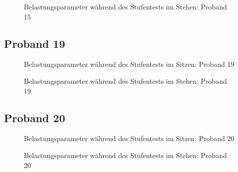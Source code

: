 \documentclass[
  letterpaper,
  DIV=11]{scrartcl}
\begin{document}
\begin{figure}


\caption{\label{fig-ST2_15}Belastungsparameter während des Stufentests
im Stehen: Proband 15}

\end{figure}%

\subsection{Proband 19}

\begin{figure}


\caption{\label{fig-ST1_19}Belastungsparameter während des Stufentests
im Sitzen: Proband 19}

\end{figure}%

\begin{figure}


\caption{\label{fig-ST2_19}Belastungsparameter während des Stufentests
im Stehen: Proband 19}

\end{figure}%

\subsection{Proband 20}

\begin{figure}


\caption{\label{fig-ST1_20}Belastungsparameter während des Stufentests
im Sitzen: Proband 20}

\end{figure}%

\begin{figure}


\caption{\label{fig-ST2_20}Belastungsparameter während des Stufentests
im Stehen: Proband 20}

\end{figure}%
\end{document}
